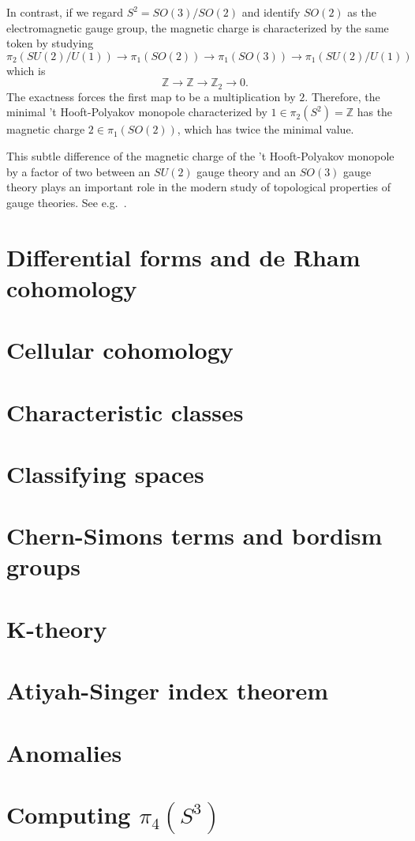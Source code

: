 \documentclass[12pt]{article}
\numberwithin{equation}{section}
\def\bZ{\mathbb{Z}}
\begin{document}
In contrast, if we regard $S^2=SO(3)/SO(2)$
and identify $SO(2)$ as the electromagnetic gauge group,
the magnetic charge is characterized by the same token by studying \begin{equation}
 \pi_2(SU(2)/U(1)) \to \pi_1(SO(2)) \to \pi_1(SO(3)) \to \pi_1(SU(2)/U(1))
\end{equation} which is \begin{equation}
 \bZ \to \bZ \to \bZ_2 \to 0.
\end{equation}
The exactness forces the first map to be a multiplication by $2$.
Therefore, the minimal 't Hooft-Polyakov monopole characterized by $1\in \pi_2(S^2)=\bZ$
has the magnetic charge $2\in \pi_1(SO(2))$, which has twice the minimal value.

This subtle difference of the magnetic charge of the 't Hooft-Polyakov monopole by a factor of two
between an $SU(2)$ gauge theory and an $SO(3)$ gauge theory
 plays an important role in the modern study of topological properties of gauge theories.
 See e.g.~\cite{Aharony:2013hda}.


\section{Differential forms and de Rham cohomology}
\label{sec:deRham}

\section{Cellular cohomology}

\section{Characteristic classes}

\section{Classifying spaces}

\section{Chern-Simons terms and bordism groups}

\section{K-theory}

\section{Atiyah-Singer index theorem}

\section{Anomalies}

\section{Computing \texorpdfstring{$\pi_4(S^3)$}{pi4(S3)}}



\end{document}

